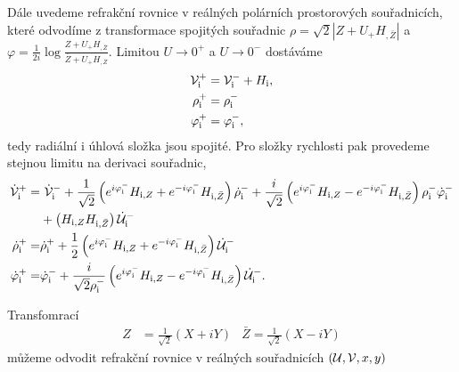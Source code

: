 Dále uvedeme refrakční rovnice v reálných polárních prostorových souřadnicích, které odvodíme z transformace spojitých souřadnic
$\rho = \sqrt{2} \left|Z + U_{+} H_{,\bar{Z}}\right|$ a $\varphi = \frac{1}{2i} \log \frac{Z + U_+ H_{,\bar{Z}}}{\bar{Z} + U_+ H_{,Z}}$.
Limitou $U \to 0^+$ a $U \to 0^-$ dostáváme
\begin{equation}
    \begin{split}
        \mathcal{V}^{+}_{\mathrm{i}} &= \mathcal{V}^{-}_{\mathrm{i}} + H_{\mathrm{i}},\\
        \rho^{+}_{\mathrm{i}} &= \rho^{-}_{\mathrm{i}}\\
        \varphi^{+}_{\mathrm{i}} &= \varphi^{-}_{\mathrm{i}},
    \end{split}
\end{equation}
tedy radiální i úhlová složka jsou spojité. Pro složky rychlosti pak provedeme stejnou limitu na derivaci souřadnic,
\begin{equation}
    \begin{split}
        \dot{\mathcal{V}}_{\mathrm{i}}^{+}=& ~\dot{\mathcal{V}}_{\mathrm{i}}^{-}+\frac{1}{\sqrt{2}}\left(e^{i \varphi_{\mathrm{i}}^{-}} H_{\mathrm{i}, Z}+e^{-i \varphi_{\mathrm{i}}^{-}} H_{\mathrm{i}, \bar{Z}}\right) \dot{\rho}_{\mathrm{i}}^{-}+\frac{i}{\sqrt{2}}\left(e^{i \varphi_{\mathrm{i}}^{-}} H_{\mathrm{i}, Z}-e^{-i \varphi_{\mathrm{i}}^{-}} H_{\mathrm{i}, \bar{Z}}\right) \rho_{\mathrm{i}}^{-} \dot{\varphi}_{\mathrm{i}}^{-} \\
        &+\left(H_{\mathrm{i}, Z} H_{\mathrm{i}, \bar{Z}}\right) \dot{\mathcal{U}}_{\mathrm{i}}^{-} \\
        \dot{\rho}_{\mathrm{i}}^{+}=& \dot{\rho}_{\mathrm{i}}^{+} + \frac{1}{2} \left(e^{i \varphi^-_\mathrm{i}} H_{\mathrm{i},Z} + e^{-i \varphi^-_\mathrm{i}} H_{\mathrm{i},\bar{Z}}\right)\dot{\mathcal{U}}_\mathrm{i}^{-}\\
        \dot{\varphi}_{\mathrm{i}}^{+}=&\dot{\varphi}_{\mathrm{i}}^{-} + \frac{i}{\sqrt{2}\rho_{\mathrm{i}}^{-}} \left(e^{i \varphi_{\mathrm{i}}^{-}} H_{\mathrm{i}, Z} - e^{-i \varphi_{\mathrm{i}}^{-}} H_{\mathrm{i}, \bar{Z}}\right) \dot{\mathcal{U}}_{\mathrm{i}}^{-}.
        \end{split}
\end{equation}

Transfomrací
\begin{align}
    Z &= \frac{1}{\sqrt{2}}\left(X + i Y\right) & \bar{Z} = \frac{1}{\sqrt{2}}\left(X - i Y\right)
\end{align}
můžeme odvodit refrakční rovnice v reálných souřadnicích $(\mathcal{U}, \mathcal{V}, x, y)$

